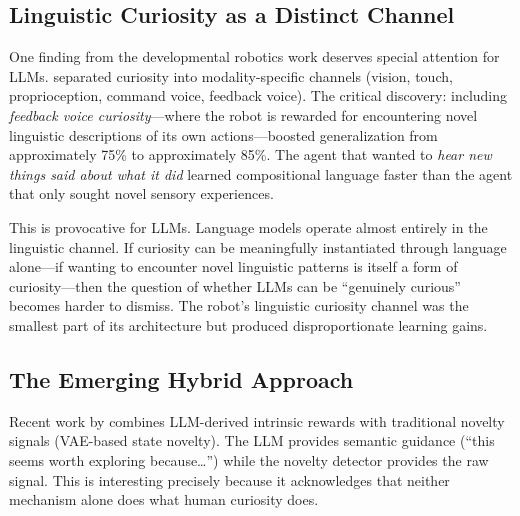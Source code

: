 \subsection{Linguistic Curiosity as a Distinct Channel}\label{subsec:linguistic-curiosity}

One finding from the developmental robotics work deserves special attention for LLMs. \citet{tinker2025} separated curiosity into modality-specific channels (vision, touch, proprioception, command voice, feedback voice). The critical discovery: including \emph{feedback voice curiosity}---where the robot is rewarded for encountering novel linguistic descriptions of its own actions---boosted generalization from approximately 75\% to approximately 85\%. The agent that wanted to \emph{hear new things said about what it did} learned compositional language faster than the agent that only sought novel sensory experiences.

This is provocative for LLMs. Language models operate almost entirely in the linguistic channel. If curiosity can be meaningfully instantiated through language alone---if wanting to encounter novel linguistic patterns is itself a form of curiosity---then the question of whether LLMs can be ``genuinely curious'' becomes harder to dismiss. The robot's linguistic curiosity channel was the smallest part of its architecture but produced disproportionate learning gains.

\subsection{The Emerging Hybrid Approach}\label{subsec:hybrid}

Recent work by \citet{quadros2025} combines LLM-derived intrinsic rewards with traditional novelty signals (VAE-based state novelty). The LLM provides semantic guidance (``this seems worth exploring because\ldots'') while the novelty detector provides the raw signal. This is interesting precisely because it acknowledges that neither mechanism alone does what human curiosity does.
